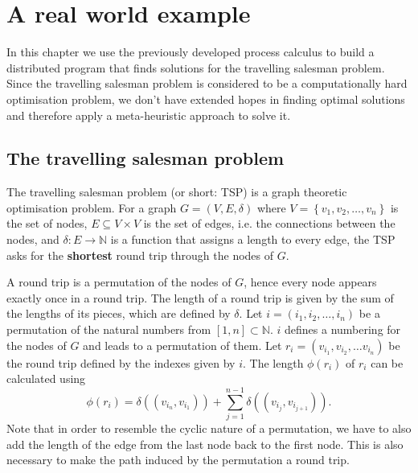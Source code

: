 \chapter{A real world example}
In this chapter we use the previously developed process calculus to build a distributed program that finds solutions for the travelling salesman problem. Since the travelling salesman problem is considered to be a computationally hard optimisation problem, we don't have extended hopes in finding optimal solutions and therefore apply a meta-heuristic approach to solve it.

\section{The travelling salesman problem}
\label{chp:tsp}
The travelling salesman problem (or short: \textsc{TSP}) is a graph theoretic optimisation problem. For a graph $G = \left( V, E, \delta \right)$ where $V = \left\{ v_1, v_2, \ldots, v_n \right\}$ is the set of nodes, $E \subseteq V \times V$ is the set of edges, i.e. the connections between the nodes, and $\delta \colon E \to \mathbb{N}$ is a function that assigns a length to every edge, the \textsc{TSP} asks for the \textbf{shortest} round trip through the nodes of $G$.



A round trip is a permutation of the nodes of $G$, hence every node appears exactly once in a round trip. The length of a round trip is given by the sum of the lengths of its pieces, which are defined by $\delta$. Let $i = \left( i_1, i_2, \ldots, i_n \right)$ be a permutation of the natural numbers from $[1, n] \subset \mathbb{N}$. $i$ defines a numbering for the nodes of $G$ and leads to a permutation of them. Let $r_i = \left( v_{i_1}, v_{i_2}, \ldots v_{i_n} \right)$ be the round trip defined by the indexes given by $i$. The length $\phi \left( r_i \right)$ of $r_i$ can be calculated using
\begin{equation}
  \label{eqn:length_roundtrip}
  \phi \left( r_i \right) = \delta \left( \left( v_{i_n}, v_{i_1} \right) \right) + \sum_{j=1}^{n-1} \delta \left( \left( v_{i_j}, v_{i_{j+1}} \right) \right).
\end{equation}
Note that in order to resemble the cyclic nature of a permutation, we have to also add the length of the edge from the last node back to the first node. This is also necessary to make the path induced by the permutation a round trip.

